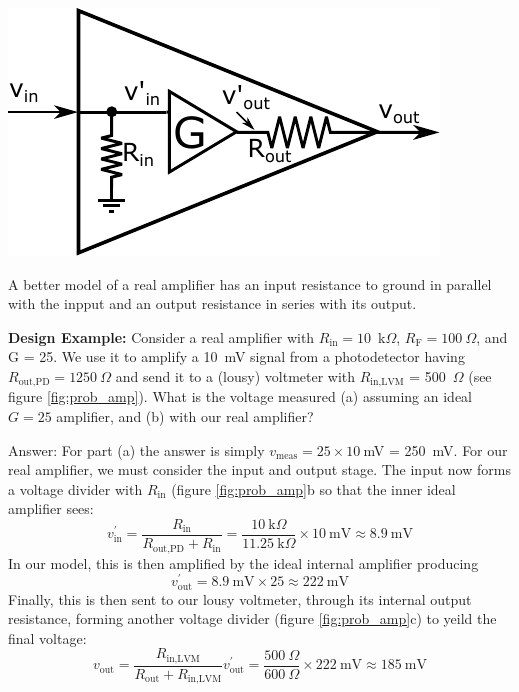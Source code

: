 \documentclass{tufte-book}
\begin{document}
\begin{marginfigure}%
  \includegraphics[width=\linewidth]{RealAmplifier_int_out}
  \caption{A better model of a real amplifier has an input resistance to ground in parallel with the inpput and an output resistance in series with its output.}
  \label{fig:real_amp_int_out}
\end{marginfigure}

\noindent\textbf{Design Example:} Consider a real amplifier with $R_\text{in} = 10$~k$\Omega$, $R_\text{F} = 100~\Omega$, and G = 25. We use it to amplify a 10~mV signal from a photodetector having $R_\text{out,PD} = 1250~\Omega$ and send it to a (lousy) voltmeter with $R_\text{in,LVM}$ = 500~$\Omega$ (see figure \ref{fig:prob_amp}). What is the voltage measured (a) assuming an ideal $G = 25$ amplifier, and (b) with our real amplifier?

\noindent Answer: For part (a) the answer is simply $v_\text{meas} = 25\times10~$mV = 250~mV. For our real amplifier, we must consider the input and output stage. The input now forms a voltage divider with $R_\text{in}$ (figure \ref{fig:prob_amp}b so that the inner ideal amplifier sees:
$$
v_\text{in}^\prime=\frac{R_\text{in}}{R_\text{out,PD} + R_\text{in}} = \frac{10~\text{k}\Omega}{11.25~\text{k}\Omega}\times10~\text{mV} \approx 8.9~\text{mV}
$$
In our model, this is then amplified by the ideal internal amplifier producing
$$
v_\text{out}^\prime = 8.9~\text{mV}\times 25 \approx 222~\text{mV}
$$
Finally, this is then sent to our lousy voltmeter, through its internal output resistance, forming another voltage divider (figure \ref{fig:prob_amp}c) to yeild the final voltage:
$$
v_\text{out} = \frac{R_\text{in,LVM}}{R_\text{out} + R_\text{in,LVM}}v_\text{out}^\prime = \frac{500~\Omega}{600~\Omega}\times 222~\text{mV}\approx 185~\text{mV}
$$
\end{document}
